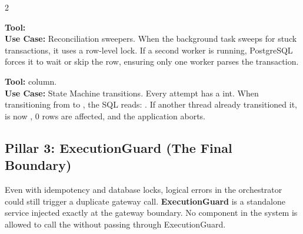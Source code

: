 \begin{multicols}{2}
\begin{tcolorbox}[infobox={Pessimistic Locking}]
\textbf{Tool:} \\
\textbf{Use Case:} Reconciliation sweepers.
When the background task sweeps for stuck transactions, it uses a row-level lock. If a second worker is running, PostgreSQL forces it to wait or skip the row, ensuring only one worker parses the transaction.
\end{tcolorbox}

\columnbreak

\begin{tcolorbox}[infobox={Optimistic Locking (OCC)}]
\textbf{Tool:}  column.\\
\textbf{Use Case:} State Machine transitions.
Every attempt has a  int. When transitioning from  to , the SQL reads: . If another thread already transitioned it,  is now , 0 rows are affected, and the application aborts.
\end{tcolorbox}
\end{multicols}

\vspace{0.8cm}

\subsection{Pillar 3: ExecutionGuard (The Final Boundary)}

Even with idempotency and database locks, logical errors in the orchestrator could still trigger a duplicate gateway call. \textbf{ExecutionGuard} is a standalone service injected exactly at the gateway boundary. No component in the system is allowed to call the  without passing through ExecutionGuard.

